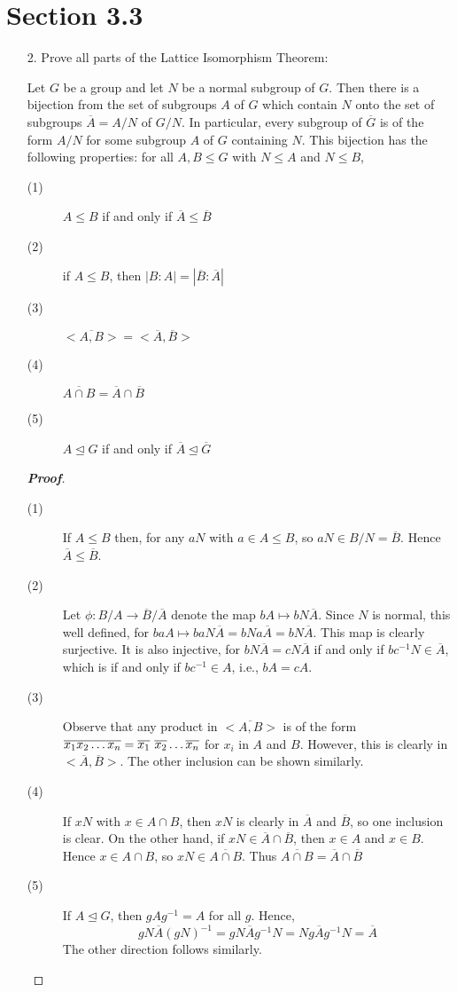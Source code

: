 \documentclass[12pt,leqno]{book}
\theoremstyle{definition}
\newenvironment{Proof}{\begin{proof}[\textnormal{\textbf{Proof}}]}{\end{proof}}
\begin{document}
\section*{Section 3.3}
\begin{enumerate}
 \item [2.] Prove all parts of the Lattice Isomorphism Theorem: 

Let $G$ be a group and let $N$ be a normal subgroup of $G$. Then there is a bijection from the set of subgroups $A$ of $G$ which contain $N$ onto the set of subgroups $\overline{A}=A/N$ of $G/N$. In particular, every subgroup of $\overline{G}$ is of the form $A/N$ for some subgroup $A$ of $G$ containing $N$. This bijection has the following properties: for all $A,B\leq G$ with $N\leq A$ and $N\leq B$,
\begin{description}
  \item [(1)] $A\leq B$ if and only if $\overline{A}\leq\overline{B}$
  \item [(2)] if $A\leq B$, then $|B:A|=|\overline{B}:\overline{A}|$
  \item [(3)] $\overline{<A,B>}=<\overline{A},\overline{B}>$
  \item [(4)] $\overline{A\cap B}=\overline{A}\cap\overline{B}$
  \item [(5)] $A\unlhd G$ if and only if $\overline{A}\unlhd\overline{G}$
 \end{description}
\begin{Proof}
 \begin{description}
  \item [(1)] If $A\leq B$ then, for any $aN$ with $a\in A\leq B$, so $aN\in B/N=\overline{B}$. Hence $\overline{A}\leq\overline{B}$.
  \item [(2)] Let $\phi:B/A\to\overline{B}/\overline{A}$ denote the map $bA\mapsto bN\overline{A}$. Since $N$ is normal, this well defined, for $baA\mapsto baN\overline{A}=bNa\overline{A}=bN\overline{A}$. This map is clearly surjective. It is also injective, for $bN\overline{A}=cN\overline{A}$ if and only if $bc^{-1}N\in\overline{A}$, which is if and only if $bc^{-1}\in A$, i.e., $bA=cA$.
  \item [(3)] Observe that any product in $\overline{<A,B>}$ is of the form $\overline{x_1x_2\hdots x_n}=\overline{x_1}\hskip.05in\overline{x_2}\hdots\overline{x_n}$ for $x_i$ in $A$ and $B$. However, this is clearly in $<\overline{A},\overline{B}>$. The other inclusion can be shown similarly.
  \item [(4)] If $xN$ with $x\in A\cap B$, then $xN$ is clearly in $\overline{A}$ and $\overline{B}$, so one inclusion is clear. On the other hand, if $xN\in\overline{A}\cap\overline{B}$, then $x\in A$ and $x\in B$. Hence $x\in A\cap B$, so $xN\in\overline{A\cap B}$. Thus $\overline{A\cap B}=\overline{A}\cap\overline{B}$ 
  \item [(5)] If $A\unlhd G$, then $gAg^{-1}=A$ for all $g$. Hence, \[gN\overline{A}(gN)^{-1}=gN\overline{A}g^{-1}N=Ng\overline{A}g^{-1}N=\overline{A}\] The other direction follows similarly.
 \end{description}


\end{Proof}
\end{enumerate}
\end{document}

